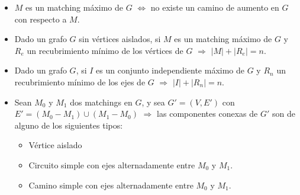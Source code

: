 \begin{itemize}
\item $M$ es un matching m\'aximo de $G$ $\Leftrightarrow$ no existe un camino de aumento en $G$ con respecto a $M$.
\item Dado un grafo $G$ sin v\'ertices aislados, si $M$ es un matching m\'aximo de $G$ y $R_e$ un recubrimiento m\'inimo de los v\'ertices de $G$ $\Rightarrow$ $|M| + |R_e| = n$.
\item Dado un grafo $G$, si $I$ es un conjunto independiente m\'aximo de $G$ y $R_n$ un recubrimiento m\'inimo de los ejes de $G$ $\Rightarrow$ $|I| + |R_n| = n$.
\item Sean $M_0$ y $M_1$ dos matchings en $G$, y sea $G' = (V, E')$ con $E' = (M_0 - M_1) \cup (M_1 - M_0)$ $\Rightarrow$ las componentes conexas de $G'$ son de alguno de los siguientes tipos:

\begin{itemize}
\item V\'ertice aislado
\item Circuito simple con ejes alternadamente entre $M_0$ y $M_1$.
\item Camino simple con ejes alternadamente entre $M_0$ y $M_1$.
\end{itemize}

\end{itemize}


